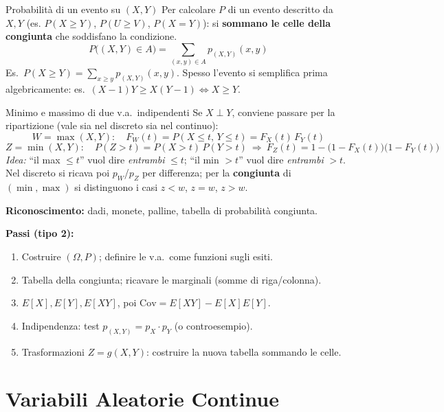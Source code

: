 \documentclass[11pt]{article}
\begin{document}
\begin{concetto}[barBlue]{Probabilit\`a di un evento su $(X,Y)$}
Per calcolare $P$ di un evento descritto da $X,Y$ (es. $P(X\ge Y)$, $P(U\ge V)$, $P(X=Y)$): si \textbf{sommano le celle della congiunta} che soddisfano la condizione.
\[ P\big((X,Y)\in A\big) = \sum_{(x,y)\in A} p_{(X,Y)}(x,y) \]
Es.\ $P(X\ge Y)=\sum_{x\ge y} p_{(X,Y)}(x,y)$. Spesso l'evento si semplifica prima algebricamente: es.\ $(X{-}1)Y \ge X(Y{-}1) \iff X\ge Y$.
\end{concetto}

\begin{concetto}[barBlue]{Minimo e massimo di due v.a.\ indipendenti}
Se $X \perp Y$, conviene passare per la ripartizione (vale sia nel discreto sia nel continuo):
\[ W=\max(X,Y):\quad F_W(t)=P(X\le t,\,Y\le t)=F_X(t)\,F_Y(t) \]
\[ Z=\min(X,Y):\quad P(Z> t)=P(X>t)\,P(Y>t) \ \Rightarrow\ F_Z(t)=1-\big(1-F_X(t)\big)\big(1-F_Y(t)\big) \]
\emph{Idea:} ``il max $\le t$'' vuol dire \emph{entrambi} $\le t$; ``il min $>t$'' vuol dire \emph{entrambi} $>t$. Nel discreto si ricava poi $p_W$/$p_Z$ per differenza; per la \textbf{congiunta} di $(\min,\max)$ si distinguono i casi $z<w$, $z=w$, $z>w$.
\end{concetto}

\begin{trucco}
\textbf{Riconoscimento:} dadi, monete, palline, tabella di probabilit\`a congiunta.

\textbf{Passi (tipo 2):}
\begin{enumerate}[leftmargin=1.4em,itemsep=1pt,topsep=2pt]
\item Costruire $(\Omega,P)$; definire le v.a.\ come funzioni sugli esiti.
\item Tabella della congiunta; ricavare le marginali (somme di riga/colonna).
\item $E[X],E[Y],E[XY]$, poi $\mathrm{Cov}=E[XY]-E[X]E[Y]$.
\item Indipendenza: test $p_{(X,Y)}=p_X\cdot p_Y$ (o controesempio).
\item Trasformazioni $Z=g(X,Y)$: costruire la nuova tabella sommando le celle.
\end{enumerate}
\end{trucco}

\newpage
\section{Variabili Aleatorie Continue}
\end{document}
